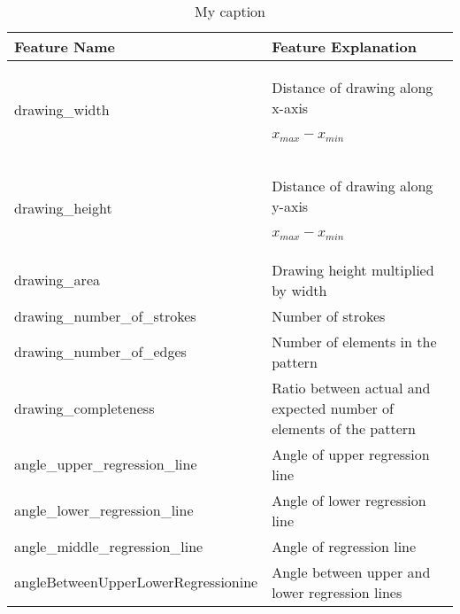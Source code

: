 \begin{table}[htb]
\centering
\caption{My caption}
\label{my-label}
\begin{tabular}{l | l}
Feature Name & Feature Explanation  \\
\hline
drawing\_width  & Distance of drawing along x-axis 

$x_{max} - x_{min}$  \\

drawing\_height & Distance of drawing along y-axis

$x_{max} - x_{min}$ \\
drawing\_area  & Drawing height multiplied by width  \\
drawing\_number\_of\_strokes & Number of strokes  \\
drawing\_number\_of\_edges & Number of elements in the pattern  \\
drawing\_completeness & Ratio between actual and expected number of elements of the pattern \\
angle\_upper\_regression\_line & Angle of upper regression line  \\
angle\_lower\_regression\_line & Angle of lower regression line  \\
angle\_middle\_regression\_line & Angle of regression line  \\
angleBetweenUpperLowerRegressionine & Angle between upper and lower regression lines 
\end{tabular}
\end{table}